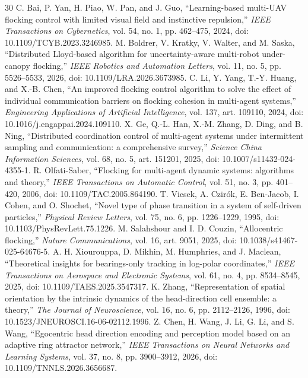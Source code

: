 \documentclass[UTF8,fontset=windows,11pt]{ctexart}
\begin{document}
\begin{thebibliography}{30}
 C. Bai, P. Yan, H. Piao, W. Pan, and J. Guo, ``Learning-based multi-UAV flocking control with limited visual field and instinctive repulsion,'' \emph{IEEE Transactions on Cybernetics}, vol. 54, no. 1, pp. 462--475, 2024, doi: 10.1109/TCYB.2023.3246985.
 M. Boldrer, V. Kratky, V. Walter, and M. Saska, ``Distributed Lloyd-based algorithm for uncertainty-aware multi-robot under-canopy flocking,'' \emph{IEEE Robotics and Automation Letters}, vol. 11, no. 5, pp. 5526--5533, 2026, doi: 10.1109/LRA.2026.3673985.
 C. Li, Y. Yang, T.-Y. Huang, and X.-B. Chen, ``An improved flocking control algorithm to solve the effect of individual communication barriers on flocking cohesion in multi-agent systems,'' \emph{Engineering Applications of Artificial Intelligence}, vol. 137, art. 109110, 2024, doi: 10.1016/j.engappai.2024.109110.
 X. Ge, Q.-L. Han, X.-M. Zhang, D. Ding, and B. Ning, ``Distributed coordination control of multi-agent systems under intermittent sampling and communication: a comprehensive survey,'' \emph{Science China Information Sciences}, vol. 68, no. 5, art. 151201, 2025, doi: 10.1007/s11432-024-4355-1.
 R. Olfati-Saber, ``Flocking for multi-agent dynamic systems: algorithms and theory,'' \emph{IEEE Transactions on Automatic Control}, vol. 51, no. 3, pp. 401--420, 2006, doi: 10.1109/TAC.2005.864190.
 T. Vicsek, A. Czirók, E. Ben-Jacob, I. Cohen, and O. Shochet, ``Novel type of phase transition in a system of self-driven particles,'' \emph{Physical Review Letters}, vol. 75, no. 6, pp. 1226--1229, 1995, doi: 10.1103/PhysRevLett.75.1226.
 M. Salahshour and I. D. Couzin, ``Allocentric flocking,'' \emph{Nature Communications}, vol. 16, art. 9051, 2025, doi: 10.1038/s41467-025-64676-5.
 A. H. Xiourouppa, D. Mikhin, M. Humphries, and J. Maclean, ``Theoretical insights for bearings-only tracking in log-polar coordinates,'' \emph{IEEE Transactions on Aerospace and Electronic Systems}, vol. 61, no. 4, pp. 8534--8545, 2025, doi: 10.1109/TAES.2025.3547317.
 K. Zhang, ``Representation of spatial orientation by the intrinsic dynamics of the head-direction cell ensemble: a theory,'' \emph{The Journal of Neuroscience}, vol. 16, no. 6, pp. 2112--2126, 1996, doi: 10.1523/JNEUROSCI.16-06-02112.1996.
 Z. Chen, H. Wang, J. Li, G. Li, and S. Wang, ``Egocentric head direction encoding and perception model based on an adaptive ring attractor network,'' \emph{IEEE Transactions on Neural Networks and Learning Systems}, vol. 37, no. 8, pp. 3900--3912, 2026, doi: 10.1109/TNNLS.2026.3656687.

\end{thebibliography}
\end{document}
